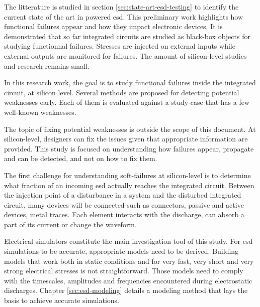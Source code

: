 The litterature is studied in section \ref{sec:state-art-esd-testing} to identify the current state of the art in powered \gls{esd}.
This preliminary work highlights how functional failures appear and how they impact electronic devices.
It is demonstrated that so far integrated circuits are studied as black-box objects for studying functionnal failures.
Stresses are injected on external inputs while external outputs are monitored for failures.
The amount of silicon-level studies and research remains small.

In this research work, the goal is to study functional failures inside the integrated circuit, at silicon level.
Several methods are proposed for detecting potential weaknesses early.
Each of them is evaluated against a study-case that has a few well-known weaknesses.

The topic of fixing potential weaknesses is outside the scope of this document.
At silicon-level, designers can fix the issues given that appropriate information are provided.
This study is focused on understanding how failures appear, propagate and can be detected, and not on how to fix them.

The first challenge for understanding soft-failures at silicon-level is to determine what fraction of an incoming \gls{esd} actually reaches the integrated circuit.
Between the injection point of a disturbance in a system and the disturbed integrated circuit, many devices will be connected such as connectors, passive and active devices, metal traces.
Each element interacts with the discharge, can absorb a part of its current or change the waveform.

Electrical simulators constitute the main investigation tool of this study.
For \gls{esd} simulations to be accurate, appropriate models need to be derived.
Building models that work both in static conditions and for very fast, very short and very strong electrical stresses is not straightforward.
Those models need to comply with the timescales, amplitudes and frequencies encountered during electrostatic discharges.
Chapter \ref{sec:esd-modeling} details a modeling method that lays the basis to achieve accurate simulations.

